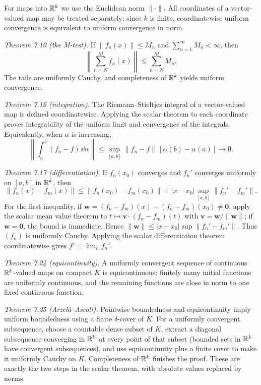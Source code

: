 \documentclass[11pt, oneside]{article}
\begin{document}
\begin{solution}
For maps into $\mathbb{R}^k$ we use the Euclidean norm $\|\cdot\|$. All coordinates of a vector-valued map may be treated separately; since $k$ is finite, coordinatewise uniform convergence is equivalent to uniform convergence in norm.

\textit{Theorem 7.10 (the M-test).} If $\|f_n(x)\|\le M_n$ and $\displaystyle\sum_{n=1}^{\infty}M_n<\infty$, then
\[
 \left\|\sum_{n=N}^{M}f_n(x)\right\|\le\sum_{n=N}^{M}M_n.
\]
The tails are uniformly Cauchy, and completeness of $\mathbb{R}^k$ yields uniform convergence.

\textit{Theorem 7.16 (integration).} The Riemann--Stieltjes integral of a vector-valued map is defined coordinatewise. Applying the scalar theorem to each coordinate proves integrability of the uniform limit and convergence of the integrals. Equivalently, when $\alpha$ is increasing,
\[
 \left\|\int_a^b(f_n-f)\,\dd\alpha\right\|
 \le\sup_{[a, b]}\|f_n-f\|\,[\alpha(b)-\alpha(a)]\longrightarrow0.
\]

\textit{Theorem 7.17 (differentiation).} If $f_n(x_0)$ converges and $f_n'$ converges uniformly on $[a, b]$ in $\mathbb{R}^k$, then
\[
 \|f_n(x)-f_m(x)\|
 \le\|f_n(x_0)-f_m(x_0)\|
 +|x-x_0|\sup_{[a, b]}\|f_n'-f_m'\|.
\]
For the first inequality, if $\mathbf w=(f_n-f_m)(x)-(f_n-f_m)(x_0)\ne\mathbf0$, apply the scalar mean value theorem to $t\mapsto\mathbf v\cdot(f_n-f_m)(t)$ with $\mathbf v=\mathbf w/\|\mathbf w\|$; if $\mathbf w=\mathbf0$, the bound is immediate. Hence $\|\mathbf w\|\le|x-x_0|\displaystyle\sup\|f_n'-f_m'\|$. Thus $(f_n)$ is uniformly Cauchy. Applying the scalar differentiation theorem coordinatewise gives $f'=\lim_nf_n'$.

\textit{Theorem 7.24 (equicontinuity).} A uniformly convergent sequence of continuous $\mathbb{R}^k$-valued maps on compact $K$ is equicontinuous: finitely many initial functions are uniformly continuous, and the remaining functions are close in norm to one fixed continuous function.

\textit{Theorem 7.25 (Arzelà--Ascoli).} Pointwise boundedness and equicontinuity imply uniform boundedness using a finite $\delta$-cover of $K$. For a uniformly convergent subsequence, choose a countable dense subset of $K$, extract a diagonal subsequence converging in $\mathbb{R}^k$ at every point of that subset (bounded sets in $\mathbb{R}^k$ have convergent subsequences), and use equicontinuity plus a finite cover to make it uniformly Cauchy on $K$. Completeness of $\mathbb{R}^k$ finishes the proof. These are exactly the two steps in the scalar theorem, with absolute values replaced by norms.
\end{solution}
\end{document}
